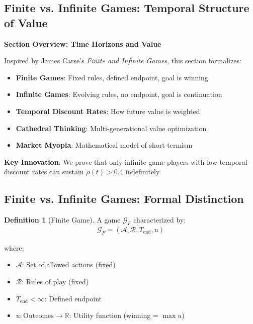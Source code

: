 \documentclass[11pt,a4paper]{article}
\theoremstyle{definition}
\newtheorem{definition}{Definition}[section]
\theoremstyle{remark}
\newcommand{\RR}{\mathbb{R}}
\begin{document}
\begin{enumerate}

\section{Finite vs. Infinite Games: Temporal Structure of Value}

\begin{mdframed}[backgroundcolor=cyan!5,linewidth=2pt]
\textbf{Section Overview: Time Horizons and Value}

Inspired by James Carse's \textit{Finite and Infinite Games}, this section formalizes:

\begin{itemize}[nosep]
    \item \textbf{Finite Games}: Fixed rules, defined endpoint, goal is winning
    \item \textbf{Infinite Games}: Evolving rules, no endpoint, goal is continuation
    \item \textbf{Temporal Discount Rates}: How future value is weighted
    \item \textbf{Cathedral Thinking}: Multi-generational value optimization
    \item \textbf{Market Myopia}: Mathematical model of short-termism
\end{itemize}

\textbf{Key Innovation}: We prove that only infinite-game players with low temporal discount rates can sustain \(\rho(t) > 0.4\) indefinitely.
\end{mdframed}

\subsection{Finite vs. Infinite Games: Formal Distinction}

\begin{definition}[Finite Game]
A game \(\mathcal{G}_F\) characterized by:
\begin{align}
\mathcal{G}_F = (\mathcal{A}, \mathcal{R}, T_{\text{end}}, u)
\end{align}

where:
\begin{itemize}
    \item \(\mathcal{A}\): Set of allowed actions (fixed)
    \item \(\mathcal{R}\): Rules of play (fixed)
    \item \(T_{\text{end}} < \infty\): Defined endpoint
    \item \(u: \text{Outcomes} \to \RR\): Utility function (winning = \(\max u\))
\end{itemize}


\end{definition}
\end{enumerate}
\end{document}
